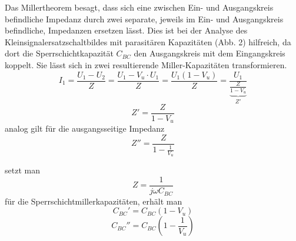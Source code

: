 Das Millertheorem besagt, dass sich eine zwischen Ein- und Ausgangskreis
befindliche Impedanz durch zwei separate, jeweils im Ein- und Ausgangskreis
befindliche, Impedanzen ersetzen lässt. Dies ist bei der Analyse des
Kleinsignalersatzschaltbildes mit parasitären Kapazitäten (Abb. 2) hilfreich, da dort die
Sperrschichtkapazität $C_{BC}$ den Ausgangskreis mit dem Eingangskreis koppelt.
Sie lässt sich in zwei resultierende Miller-Kapazitäten transformieren.
\[I_1 = \frac{U_1 - U_2}{Z} = \frac{U_1 - V_u \cdot U_1}{Z} = \frac{U_1
    (1-V_u)}{Z} = \frac{U_1}{ \underbrace{\frac{Z}{1-V_u}}_{Z'} }\]
\[Z' = \frac{Z}{1-V_u}\]
\noindent analog gilt für die ausgangsseitige Impedanz
\[Z'' = \frac{Z}{1- \frac{1}{V_u} }\]

\noindent setzt man
\[Z = \frac{1}{j \omega C_{BC}}\]
\noindent für die Sperrschichtmillerkapazitäten, erhält man
\[C_{BC}' = C_{BC}(1-V_u)\]
\[C_{BC}'' = C_{BC}(1-\frac{1}{V_u})\]
